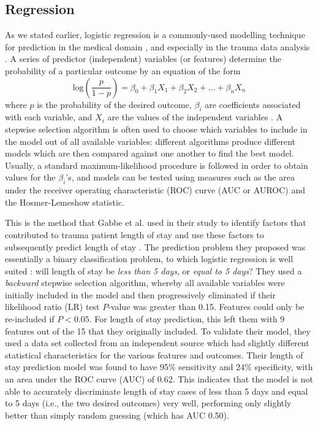\subsection{Regression}
As we stated earlier, logistic regression is a commonly-used modelling
technique for prediction in the medical domain \citep{Tu1996}, and especially
in the trauma data analysis \citep{Gabbe2005}. A series of
predictor (independent) variables (or features) determine the probability of a
particular outcome by an equation of the form
\begin{equation*}
\mathrm{log}\left(\frac{p}{1-p}\right) = \beta_0 + \beta_1X_1 + \beta_2X_2 + \dots + \beta_nX_n
\end{equation*}
where $p$ is the probability of the desired outcome, $\beta_i$ are coefficients
associated with each variable, and $X_i$ are the values of the independent
variables \citep{Hosmer1989}. A stepwise selection algorithm is often used to
choose which variables to include in the model out of all available variables:
different algorithms produce different models which are then compared against
one another to find the best model. Usually, a standard maximum-likelihood
procedure is followed in order to obtain values for the $\beta_i$'s, and models
can be tested using measures such as the area under the receiver operating
characteristic (ROC) curve (AUC or AUROC) and the Hosmer-Lemeshow statistic.

This is the method that Gabbe et al. used in their study to identify factors
that contributed to trauma patient length of stay and use these factors to
subsequently predict length of stay \citep{Gabbe2005}. The prediction problem
they proposed was essentially a binary classification problem, to which
logistic regression is well suited \citep{Tu1996}: will length of stay be
\textit{less than 5 days}, or \textit{equal to 5 days}? They used a
\textit{backward} stepwise selection algorithm, whereby all available variables
were initially included in the model and then progressively eliminated if their
likelihood ratio (LR) test $P$-value was greater than 0.15. Features could
only be re-included if $P<0.05$. For length of stay
prediction, this left them with 9 features out of the 15 that they originally
included. To validate their model, they used a data set collected from an
independent source which had slightly different statistical characteristics for
the various features and outcomes. Their length of stay prediction model was
found to have 95\% sensitivity and 24\% specificity, with an area under the ROC
curve (AUC) of 0.62. This indicates that the model is not able to accurately
discriminate
length of stay cases of less than 5 days and equal to 5 days (i.e., the two
desired outcomes) very well, performing only
slightly better than simply random guessing (which has AUC 0.50).

